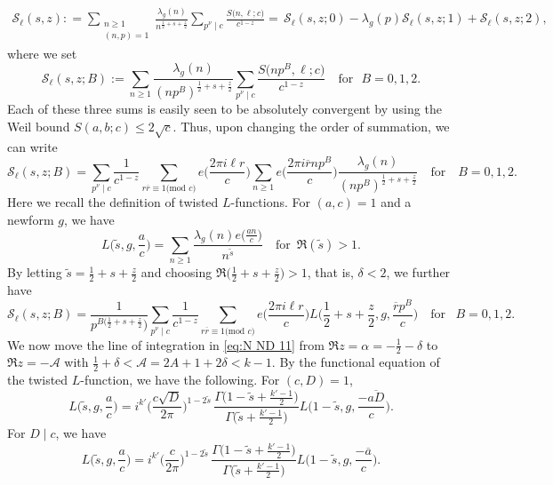 \documentclass[12pt]{amsart}
\theoremstyle{plain}
\theoremstyle{definition}
\begin{document}
    \begin{align*}
     \mathcal{S}_\ell(s, z)
    : =
    \sum_{\substack{n\geq 1\\ (n, p)=1}}
    \frac{\lambda_g(n)}{n^{\frac12+s+\frac{z}{2}}}  
    \sum_{p^\nu \mid c} 
    \frac{S\big(n, \ell; c\big)}{c^{1-z}} 
    =\,  \mathcal{S}_\ell(s, z; 0) - \lambda_g(p)  \mathcal{S}_\ell(s, z; 1)+  \mathcal{S}_\ell(s, z;2) ,
    \end{align*}
where we set
    \[
    \mathcal{S}_\ell(s, z; B) := \sum_{n\geq 1}
    \frac{\lambda_g(n)}{(np^B)^{\frac12+s+\frac{z}{2}}}  
    \sum_{p^\nu \mid c} 
    \frac{S\big(np^B, \ell; c\big)}{c^{1-z}}  \quad
    \text{for }\,\, B= 0, 1, 2.
    \]
Each of these three sums is easily seen to be absolutely convergent by using the Weil bound $S(a, b; c) \leq 2\sqrt{c} $. Thus, upon changing the order of summation, we can write 
    \[
     \mathcal{S}_\ell(s, z; B)
     =  \sum_{p^\nu \mid c} \frac{1}{c^{1-z}} \sum_{r \overline{r} \equiv 1 \text{(mod } c )} e \Big(\frac{2\pi i \ell r}{c}\Big)
    \sum_{n\geq 1} e \Big(\frac{2\pi i \overline{r} np^B}{c}\Big) \frac{\lambda_g(n)}{(np^B)^{\frac12+s+\frac{z}{2}}} 
    \quad 
    \text{for} \quad
    B=0, 1, 2.
    \]
Here we recall the definition of twisted $L$-functions. For $(a, c)=1$ and a newform $g$, we have
    \[
    L\Big(\tilde{s}, g, \frac{a}{c} \Big) = \sum_{n\geq 1} \frac{\lambda_g(n) e \big(\frac{an}{c}\big)}{n^{\tilde{s}}} \quad \text{for } \, \Re(\tilde{s}) >1. 
    \]
By letting $\tilde{s}=\frac12+s+\frac{z}{2}$ and choosing $\Re \big(\frac12+s+\frac{z}{2}\big)>1$, that is, $\delta <2 $, we further have
    \[
    \mathcal{S}_\ell(s, z; B)  =  \frac{1}{p^{B(\frac12+s+\frac{z}{2}})}  \sum_{p^\nu \mid c}  \frac{1}{c^{1-z}} \sum_{r \overline{r} \equiv 1 \text{(mod } c )} e \Big(\frac{2\pi i \ell r}{c}\Big)
    L\Big(\frac12+s+\frac{z}{2}, g, \frac{\overline{r} p^B}{c}\Big) \quad 
    \text{for } \,\,\,
    B=0, 1, 2.
    \]
We now move the line of integration in \eqref{eq:N ND 11} from $\Re z=\alpha= -\frac12-\delta$ to $\Re z = -\mathcal{A}$ with $\frac12 + \delta < \mathcal{A}=2A+1+2\delta < k-1$. By the functional equation of the twisted $L$-function, we have the following. For $(c, D)=1$, 
    \[
    L\Big(\tilde{s}, g, \frac{a}{c} \Big) 
    = 
     i^{k'}
    \Big(\frac{c\sqrt{D}}{2\pi} \Big)^{1-2\tilde{s}}
    \,
    \frac{\Gamma\big(1-\tilde{s}+\frac{k'-1}{2}\big)}{\Gamma\big(\tilde{s}+\frac{k'-1}{2}\big)}
    L\Big(1-\tilde{s}, g, \frac{-\overline{aD}}{c} \Big) .
    \]
For $D \mid c$, we have
    \[
    L\Big(\tilde{s}, g, \frac{a}{c} \Big) 
    = 
     i^{k'}
    \Big(\frac{c}{2\pi} \Big)^{1-2\tilde{s}}
    \,
    \frac{\Gamma\big(1-\tilde{s}+\frac{k'-1}{2}\big)}{\Gamma\big(\tilde{s}+\frac{k'-1}{2}\big)}
    L\Big(1-\tilde{s}, g, \frac{-\overline{a}}{c} \Big) .
    \]
\end{document}
